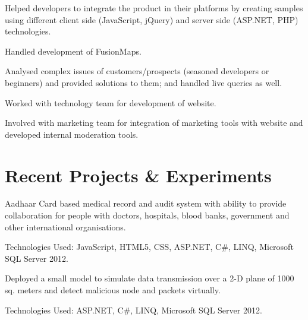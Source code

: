 \documentclass[]{gagan-resume}
\begin{document}
\begin{minipage}[t]{0.66\textwidth}
\begin{tightemize}
\item Helped developers to integrate the product in their platforms by creating samples using different client side (JavaScript, jQuery) and server side (ASP.NET, PHP) technologies.
\item Handled development of FusionMaps.
\item Analysed complex issues of customers/prospects (seasoned developers or beginners) and provided solutions to them; and handled live queries as well.
\end{tightemize}
\sectionsep

\begin{tightemize}
\item Worked with technology team for development of website.
\item Involved with marketing team for integration of marketing tools with website and developed internal moderation tools.
\end{tightemize}
\sectionsep



\section{Recent Projects \& Experiments}
\begin{tightemize}
\item Aadhaar Card based medical record and audit system with ability to provide collaboration for people with doctors, hospitals, blood banks, government and other international organisations.
\item Technologies Used: JavaScript, HTML5, CSS, ASP.NET, C\#, LINQ, Microsoft SQL Server 2012.
\end{tightemize}
\sectionsep

\begin{tightemize}
\item Deployed a small model to simulate data transmission over a 2-D plane of 1000 sq. meters and detect malicious node and packets virtually.
\item Technologies Used: ASP.NET, C\#, LINQ, Microsoft SQL Server 2012.
\end{tightemize}
\sectionsep



\end{minipage} 
\end{document}
